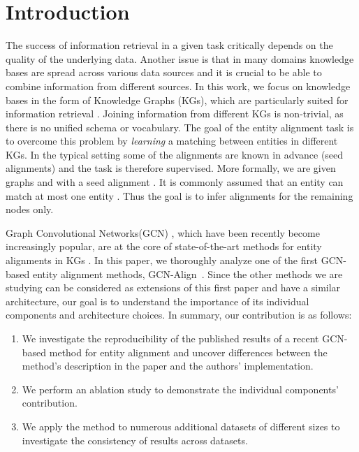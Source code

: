 \documentclass[runningheads]{llncs}
\begin{document}
\section{Introduction}
The success of information retrieval in a given task critically depends on the quality of the underlying data. Another issue is that in many domains knowledge bases are spread across various data sources \cite{nickel2015review} and it is crucial to be able to combine information from different sources.
In this work, we focus on knowledge bases in the form of Knowledge Graphs (KGs), which are particularly suited for information retrieval \cite{singhal2012introducing}.
Joining information from different KGs is non-trivial, as there is no unified schema or vocabulary. The goal of the entity alignment task is to overcome this problem by \emph{learning} a matching between entities in different KGs. In the typical setting some of the alignments are known in advance (seed alignments) and the task is therefore supervised. More formally, we are given graphs  and  
with a seed alignment .
It is commonly assumed that an entity  can match at most one entity .
Thus the goal is to infer alignments for the remaining nodes only.

Graph Convolutional Networks(GCN) \cite{kipf2016semi,gilmer2017neural}, which have been recently become increasingly popular, are at the core of state-of-the-art methods for entity alignments in KGs \cite{DBLP:conf/emnlp/WangLLZ18,DBLP:conf/acl/CaoLLLLC19,xu2019cross,DBLP:conf/ijcai/ZhuZ0TG19,anonymous2020deep}.
In this paper, we thoroughly analyze one of the first GCN-based entity alignment methods, GCN-Align~\cite{DBLP:conf/emnlp/WangLLZ18}.
Since the other methods we are studying can be considered as extensions of this first paper and have a similar architecture, our goal is to understand the importance of its individual components and architecture choices.
\noindent In summary, our contribution is as follows:
\begin{enumerate}
    \item We investigate the reproducibility of the published results of a recent GCN-based method for entity alignment and uncover differences between the method's description in the paper and the authors' implementation.
    \item We perform an ablation study to demonstrate the individual components' contribution.
    \item We apply the method to numerous additional datasets of different sizes to investigate the consistency of results across datasets.
\end{enumerate}
\end{document}
